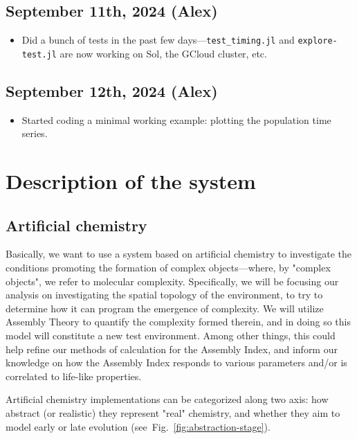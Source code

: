 \documentclass[11pt]{article}
\begin{document}
\subsection{September 11th, 2024  (Alex)}

\begin{itemize}
    \item Did a bunch of tests in the past few days—\texttt{test\_timing.jl} and \texttt{explore-test.jl} are now working on Sol, the GCloud cluster, etc.
\end{itemize}

\subsection{September 12th, 2024  (Alex)}

\begin{itemize}
    \item Started coding a minimal working example: plotting the population time series.
\end{itemize}

\clearpage

\section{Description of the system}
\label{sec:desc-system}

\subsection{Artificial chemistry}
\label{subsec:artificial-chemistry}

Basically, we want to use a system based on artificial chemistry to investigate the conditions promoting the formation of complex objects---where, by "complex objects", we refer to molecular complexity. Specifically, we will be focusing our analysis on investigating the spatial topology of the environment, to try to determine how it can program the emergence of complexity. We will utilize Assembly Theory to quantify the complexity formed therein, and in doing so this model will constitute a new test environment. Among other things, this could help refine our methods of calculation for the Assembly Index, and inform our knowledge on how the Assembly Index responds to various parameters and/or is correlated to life-like properties.

Artificial chemistry implementations can be categorized along two axis: how abstract (or realistic) they represent "real" chemistry, and whether they aim to model early or late evolution (see~Fig.~\ref{fig:abstraction-stage}).
\end{document}
